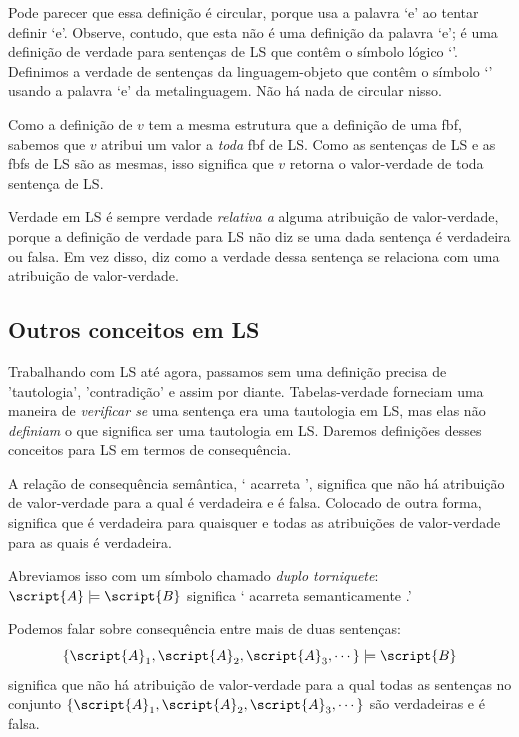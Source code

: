 Pode parecer que essa definição é circular, porque usa a palavra `e' ao tentar definir `e'. Observe, contudo, que esta não é uma definição da palavra `e'; é uma definição de verdade para sentenças de LS que contêm o símbolo lógico `\eand'. Definimos a verdade de sentenças da linguagem-objeto que contêm o símbolo `\eand' usando a palavra `e' da metalinguagem. Não há nada de circular nisso.

Como a definição de $v$ tem a mesma estrutura que a definição de uma fbf, sabemos que $v$ atribui um valor a \emph{toda} fbf de LS. Como as sentenças de LS e as fbfs de LS são as mesmas, isso significa que $v$ retorna o valor-verdade de toda sentença de LS.

Verdade em LS é sempre verdade \emph{relativa a} alguma atribuição de valor-verdade, porque a definição de verdade para LS não diz se uma dada sentença é verdadeira ou falsa. Em vez disso, diz como a verdade dessa sentença se relaciona com uma atribuição de valor-verdade.

\subsection{Outros conceitos em LS}

Trabalhando com LS até agora, passamos sem uma definição precisa de 'tautologia', 'contradição' e assim por diante. Tabelas-verdade forneciam uma maneira de \emph{verificar se} uma sentença era uma tautologia em LS, mas elas não \emph{definiam} o que significa ser uma tautologia em LS. Daremos definições desses conceitos para LS em termos de consequência.

A relação de consequência semântica, ` acarreta ', significa que não há atribuição de valor-verdade para a qual  é verdadeira e  é falsa. Colocado de outra forma, significa que  é verdadeira para quaisquer e todas as atribuições de valor-verdade para as quais  é verdadeira.

Abreviamos isso com um símbolo chamado \emph{duplo torniquete}:
$\script{A}\models\script{B}$ significa ` acarreta semanticamente .'

Podemos falar sobre consequência entre mais de duas sentenças: $$\{\script{A}_1,\script{A}_2,\script{A}_3,\cdots\}\models\script{B}$$ significa que não há atribuição de valor-verdade para a qual todas as sentenças no conjunto $\{\script{A}_1,\script{A}_2,\script{A}_3,\cdots\}$ são verdadeiras e  é falsa.

